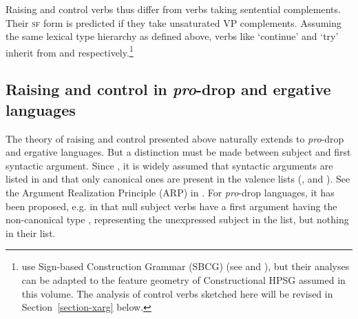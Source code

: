 Raising  and control verbs thus differ from verbs taking sentential complements. Their \textsc{sf} form is
predicted if they take unsaturated VP complements. Assuming the same lexical type hierarchy as
defined above, verbs like  `continue' and  `try' inherit from
 and 
 respectively.\footnote{\citeauthor{HenriandLaurens2011} use Sign-based Construction Grammar (SBCG) (see
   and
  ), but their analyses can be adapted to the
  feature geometry of Constructional HPSG \citep{Sag97a} assumed in this volume. The analysis of
  control verbs sketched here will be revised in Section~\ref{section-xarg} below.}


\subsection{Raising and control in \emph{pro}-drop and ergative languages}

The theory of raising and control presented above naturally extends to \emph{pro}-drop and ergative
languages.  But a distinction must be made between subject and first syntactic argument. Since \citet*{BMS2001a}, it is widely assumed
  that syntactic arguments are listed in \argst and
that only canonical ones are present in the valence lists (\subj, \spr and \comps). See the Argument Realization Principle (ARP) in \crossrefchapterw[\pageref{properties:ex-ARP}]{properties}.
For \emph{pro}-drop languages,
it has been proposed, e.g. in \citep[]{ManningandSag1998} that null subject verbs have
a first argument having the non-canonical  type , representing the unexpressed subject in the \argst list, but nothing in
their \subj list.

